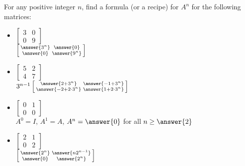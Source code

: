 \documentclass{ximera}
\begin{document}
\begin{exercise}
    For any positive integer $n$, find a formula (or a recipe) for $A^n$ for the following matrices:
    \begin{itemize}
        \item
        $\begin{bmatrix}
            3 & 0 \\ 
            0 & 9
        \end{bmatrix}$\\
        $\left[\begin{smallmatrix} \answer{3^n} & \answer{0} \\ \answer{0} & \answer{9^n} \end{smallmatrix}\right]$
        \item
        $\begin{bmatrix}
            5 & 2 \\ 
            4 & 7
        \end{bmatrix}$\\
        $3^{n-1}\left[\begin{smallmatrix} \answer{2 + 3^n} & \answer{-1 + 3^n} \\ \answer{-2 + 2\cdot3^n} & \answer{1 + 2\cdot 3^n} \end{smallmatrix}\right]$
        \item
        $\begin{bmatrix}
            0 & 1 \\ 
            0 & 0
        \end{bmatrix}$\\
        $A^0 = I$, $A^1 = A$, $A^n = \answer{0}$ for all $n \geq \answer{2}$
        \item
        $\begin{bmatrix}
            2 & 1 \\ 
            0 & 2
        \end{bmatrix}$\\
        $\left[\begin{smallmatrix} \answer{2^n} & \answer{n2^{n-1}} \\ \answer{0} & \answer{2^n} \end{smallmatrix}\right]$
    \end{itemize}
\end{exercise}
\end{document}
